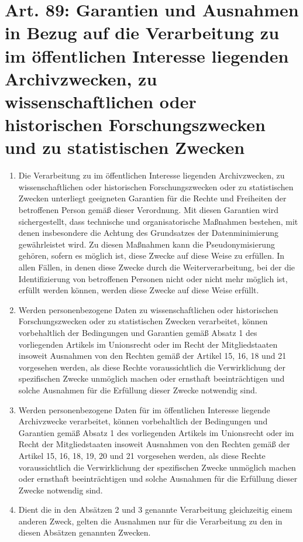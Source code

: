 \documentclass[A4, 12pt]{scrbook}
\begin{document}
    \section[Art. 89: Garantien]{Art. 89: Garantien und Ausnahmen in Bezug auf die Verarbeitung zu im öffentlichen Interesse liegenden Archivzwecken, zu wissenschaftlichen oder historischen Forschungszwecken und zu statistischen Zwecken}
        \begin{enumerate}[label=(\arabic*)]
            \item Die Verarbeitung zu im öffentlichen Interesse liegenden Archivzwecken, zu wissenschaftlichen oder historischen Forschungszwecken oder zu statistischen Zwecken unterliegt geeigneten Garantien für die Rechte und Freiheiten der betroffenen Person gemäß dieser Verordnung. Mit diesen Garantien wird sichergestellt, dass technische und organisatorische Maßnahmen bestehen, mit denen insbesondere die Achtung des Grundsatzes der Datenminimierung gewährleistet wird. Zu diesen Maßnahmen kann die Pseudonymisierung gehören, sofern es möglich ist, diese Zwecke auf diese Weise zu erfüllen. In allen Fällen, in denen diese Zwecke durch die Weiterverarbeitung, bei der die Identifizierung von betroffenen Personen nicht oder nicht mehr möglich ist, erfüllt werden können, werden diese Zwecke auf diese Weise erfüllt.
            \item Werden personenbezogene Daten zu wissenschaftlichen oder historischen Forschungszwecken oder zu statistischen Zwecken verarbeitet, können vorbehaltlich der Bedingungen und Garantien gemäß Absatz 1 des vorliegenden Artikels im Unionsrecht oder im Recht der Mitgliedstaaten insoweit Ausnahmen von den Rechten gemäß der Artikel 15, 16, 18 und 21 vorgesehen werden, als diese Rechte voraussichtlich die Verwirklichung der spezifischen Zwecke unmöglich machen oder ernsthaft beeinträchtigen und solche Ausnahmen für die Erfüllung dieser Zwecke notwendig sind.
            \item Werden personenbezogene Daten für im öffentlichen Interesse liegende Archivzwecke verarbeitet, können vorbehaltlich der Bedingungen und Garantien gemäß Absatz 1 des vorliegenden Artikels im Unionsrecht oder im Recht der Mitgliedstaaten insoweit Ausnahmen von den Rechten gemäß der Artikel 15, 16, 18, 19, 20 und 21 vorgesehen werden, als diese Rechte voraussichtlich die Verwirklichung der spezifischen Zwecke unmöglich machen oder ernsthaft beeinträchtigen und solche Ausnahmen für die Erfüllung dieser Zwecke notwendig sind. 
            \item Dient die in den Absätzen 2 und 3 genannte Verarbeitung gleichzeitig einem anderen Zweck, gelten die Ausnahmen nur für die Verarbeitung zu den in diesen Absätzen genannten Zwecken. 
        \end{enumerate}
\end{document}
